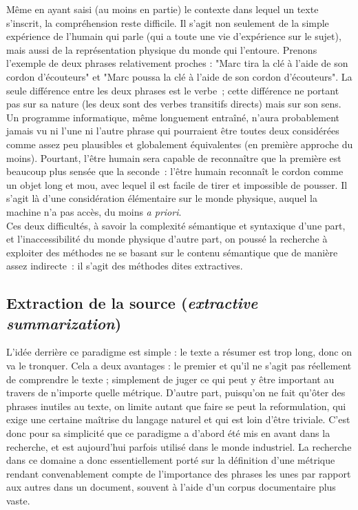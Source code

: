 \documentclass[a4paper, 12pt]{article}
\begin{document}
Même en ayant saisi (au moins en partie) le contexte dans lequel un texte s'inscrit, la compréhension reste difficile. Il s'agit non seulement de la simple expérience de l'humain qui parle (qui a toute une vie d'expérience sur le sujet), mais aussi de la représentation physique du monde qui l'entoure. Prenons l'exemple de deux phrases relativement proches : "Marc tira la clé à l'aide de son cordon d'écouteurs" et "Marc poussa la clé à l'aide de son cordon d'écouteurs". La seule différence entre les deux phrases est le verbe~; cette différence ne portant pas sur sa nature (les deux sont des verbes transitifs directs) mais sur son sens. Un programme informatique, même longuement entraîné, n'aura probablement jamais vu ni l'une ni l'autre phrase qui pourraient être toutes deux considérées comme assez peu plausibles et globalement équivalentes (en première approche du moins). Pourtant, l'être humain sera capable de reconnaître que la première est beaucoup plus sensée que la seconde~: l'être humain reconnaît le cordon comme un objet long et mou, avec lequel il est facile de tirer et impossible de pousser. Il s'agit là d'une considération élémentaire sur le monde physique, auquel la machine n'a pas accès, du moins \emph{a priori}.\\

Ces deux difficultés, à savoir la complexité sémantique et syntaxique d'une part, et l'inaccessibilité du monde physique d'autre part, on poussé la recherche à exploiter des méthodes ne se basant sur le contenu sémantique que de manière assez indirecte~: il s'agit des méthodes dites extractives.


\subsection{Extraction de la source (\emph{extractive summarization})}

L'idée derrière ce paradigme est simple : le texte a résumer est trop long, donc on va le tronquer. Cela a deux avantages : le premier et qu'il ne s'agit pas réellement de comprendre le texte ; simplement de juger ce qui peut y être important au travers de n'importe quelle métrique. D'autre part, puisqu'on ne fait qu'ôter des phrases inutiles au texte, on limite autant que faire se peut la reformulation, qui exige une certaine maîtrise du langage naturel et qui est loin d'être triviale. C'est donc pour sa simplicité que ce paradigme a d'abord été mis en avant dans la recherche, et est aujourd'hui parfois utilisé dans le monde industriel. La recherche dans ce domaine a donc essentiellement porté sur la définition d'une métrique rendant convenablement compte de l'importance des phrases les unes par rapport aux autres dans un document, souvent à l'aide d'un corpus documentaire plus vaste.\\
\end{document}
